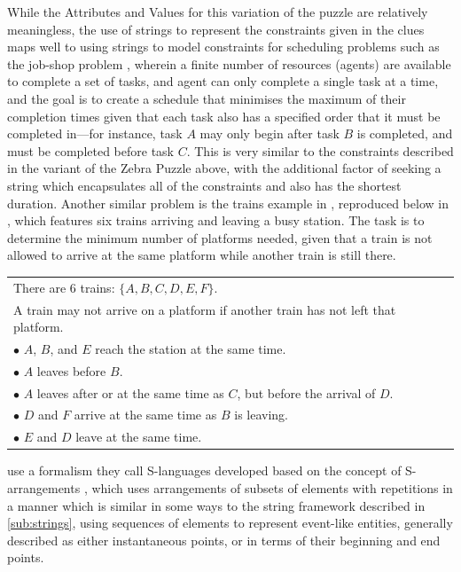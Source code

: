 \documentclass[a4paper,12pt,leqno]{article}
\begin{document}
While the Attributes and Values for this variation of the puzzle are relatively meaningless, the use of strings to represent the constraints given in the clues maps well to using strings to model constraints for scheduling problems such as the job-shop problem \citep{manne1960job,applegate1991computational}, wherein a finite number of resources (agents) are available to complete a set of tasks, and agent can only complete a single task at a time, and the goal is to create a schedule that minimises the maximum of their completion times given that each task also has a specified order that it must be completed in---for instance, task $A$ may only begin after task $B$ is completed, and must be completed before task $C$. This is very similar to the constraints described in the variant of the Zebra Puzzle above, with the additional factor of seeking a string which encapsulates all of the constraints and also has the shortest duration. Another similar problem is the trains example in \citet{durand2008tool}, reproduced below in , which features six trains arriving and leaving a busy station. The task is to determine the minimum number of platforms needed, given that a train is not allowed to arrive at the same platform while another train is still there.
\begin{center}
	\begin{tabular}[h!]{|l|}
		\hline
		There are 6 trains: $\{A,B,C,D,E,F\}$.\\
		A train may not arrive on a platform if another train has not left that platform.\\
		$\bullet$ $A$, $B$, and $E$ reach the station at the same time.\\
		$\bullet$ $A$ leaves before $B$.\\
		$\bullet$ $A$ leaves after or at the same time as $C$, but before the arrival of $D$.\\
		$\bullet$ $D$ and $F$ arrive at the same time as $B$ is leaving.\\
		$\bullet$ $E$ and $D$ leave at the same time.\\
		\hline
	\end{tabular}
	\label{tab:train-problem-clues}
\end{center}
\citet[p. 3298]{durand2008tool} use a formalism they call S-languages developed based on the concept of S-arrangements \citep{schwer2002s}, which uses arrangements of subsets of elements with repetitions in a manner which is similar in some ways to the string framework described in \cref{sub:strings}, using sequences of elements to represent event-like entities, generally described as either instantaneous points, or in terms of their beginning and end points.
\end{document}
